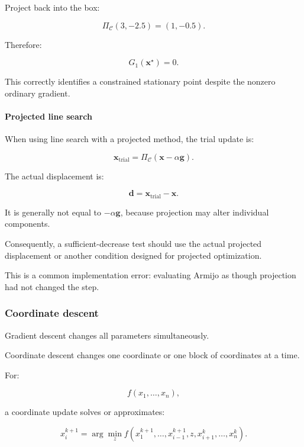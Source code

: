 Project back into the box:

\[
\Pi_{\mathcal C}(3,-2.5)=(1,-0.5).
\]

Therefore:

\[
G_1(\mathbf x^\star)=0.
\]

This correctly identifies a constrained stationary point despite the nonzero ordinary gradient.

\paragraph{Projected line search}\label{02-foundations-ii-ch027-projected-line-search}

\hypertarget{02-foundations-ii-ch027-projected-line-search}{}

When using line search with a projected method, the trial update is:

\[
\mathbf x_{\mathrm{trial}} = \Pi_{\mathcal C} (\mathbf x-\alpha\mathbf g).
\]

The actual displacement is:

\[
\mathbf d= \mathbf x_{\mathrm{trial}}-\mathbf x.
\]

It is generally not equal to \(-\alpha\mathbf g\), because projection may alter individual components.

Consequently, a sufficient-decrease test should use the actual projected displacement or another condition designed for projected optimization.

This is a common implementation error: evaluating Armijo as though projection had not changed the step.

\subsubsection{Coordinate descent}\label{02-foundations-ii-ch027-coordinate-descent}

\hypertarget{02-foundations-ii-ch027-coordinate-descent}{}

Gradient descent changes all parameters simultaneously.

Coordinate descent changes one coordinate or one block of coordinates at a time.

For:

\[
f(x_1,\ldots,x_n),
\]

a coordinate update solves or approximates:

\[
\boxed{ x_i^{k+1} = \arg\min_z f(x_1^{k+1},\ldots,x_{i-1}^{k+1}, z,x_{i+1}^{k},\ldots,x_n^k) }.
\]

